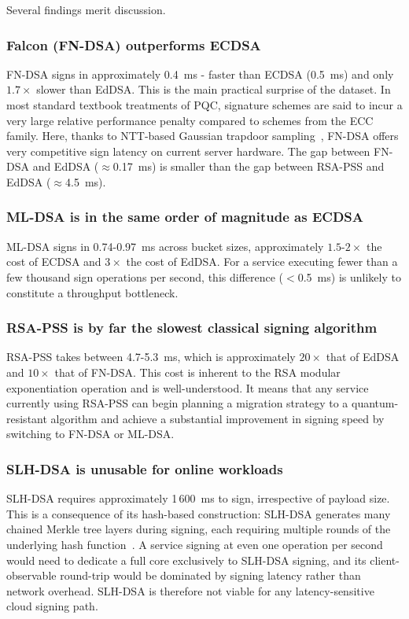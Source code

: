 \documentclass[12pt,a4paper]{article}
\begin{document}
Several findings merit discussion.

\subsubsection{Falcon (FN-DSA) outperforms ECDSA}
FN-DSA signs in approximately 0.4~ms - faster than ECDSA (0.5~ms) and only $1.7\times$ slower than EdDSA. This is the main practical surprise of the dataset. In most standard textbook treatments of PQC, signature schemes are said to incur a very large relative performance penalty compared to schemes from the ECC family. Here, thanks to NTT-based Gaussian trapdoor sampling~\cite{nist-fips206-2024}, FN-DSA offers very competitive sign latency on current server hardware. The gap between FN-DSA and EdDSA ($\approx$0.17~ms) is smaller than the gap between RSA-PSS and EdDSA ($\approx$4.5~ms).

\subsubsection{ML-DSA is in the same order of magnitude as ECDSA}
ML-DSA signs in 0.74-0.97~ms across bucket sizes, approximately $1.5$-$2\times$ the cost of ECDSA and $3\times$ the cost of EdDSA. For a service executing fewer than a few thousand sign operations per second, this difference ($<$0.5~ms) is unlikely to constitute a throughput bottleneck.

\subsubsection{RSA-PSS is by far the slowest classical signing algorithm }
RSA-PSS takes between 4.7-5.3~ms, which is approximately $20\times$ that of EdDSA and $10\times$ that of FN-DSA. This cost is inherent to the RSA modular exponentiation operation and is well-understood. It means that any service currently using RSA-PSS can begin planning a migration strategy to a quantum-resistant algorithm and achieve a substantial improvement in signing speed by switching to FN-DSA or ML-DSA.

\subsubsection{SLH-DSA is unusable for online workloads}
SLH-DSA requires approximately 1\,600~ms to sign, irrespective of payload size. This is a consequence of its hash-based construction: SLH-DSA generates many chained Merkle tree layers during signing, each requiring multiple rounds of the underlying hash function~\cite{nist-fips-205-2024}. A service signing at even one operation per second would need to dedicate a full core exclusively to SLH-DSA signing, and its client-observable round-trip would be dominated by signing latency rather than network overhead. SLH-DSA is therefore not viable for any latency-sensitive cloud signing path.
\end{document}
